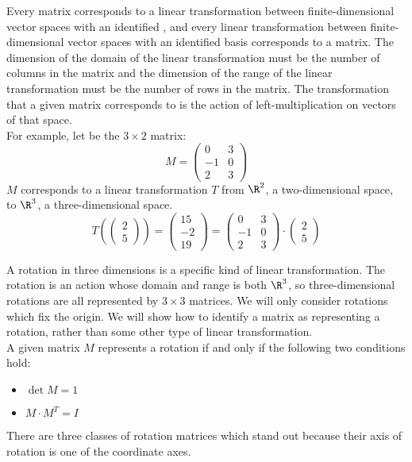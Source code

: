 
Every matrix corresponds to a linear transformation between finite-dimensional vector spaces with an identified , and every linear transformation between finite-dimensional vector spaces with an identified basis corresponds to a matrix. The dimension of the domain of the linear transformation must be the number of columns in the matrix and the dimension of the range of the linear transformation must be the number of rows in the matrix. The transformation that a given matrix corresponds to is the action of left-multiplication on vectors of that space. \\

For example, let  be the $3\times 2$ matrix:
\[
M= \begin{pmatrix} 0 & 3 \\ -1 & 0 \\ 2 & 3 \end{pmatrix}
\]
$M$ corresponds to a linear transformation $T$ from $\R^2$, a two-dimensional space, to $\R^3$, a three-dimensional space.
\[
T\left( \begin{pmatrix} 2 \\ 5 \end{pmatrix} \right)= \begin{pmatrix} 15 \\ -2 \\ 19 \end{pmatrix} = \begin{pmatrix} 0 & 3 \\ -1 & 0 \\ 2 & 3 \end{pmatrix} \cdot \begin{pmatrix} 2 \\ 5 \end{pmatrix}
\]


A rotation in three dimensions is a specific kind of linear transformation. The rotation is an action whose domain and range is both $\R^3$, so three-dimensional rotations are all represented by $3\times 3$ matrices. We will only consider rotations which fix the origin. We will show how to identify a matrix as representing a rotation, rather than some other type of linear transformation. \\

A given matrix $M$ represents a rotation if and only if the following two conditions hold:
\begin{itemize}
\item $\det M=1$
\item $M \cdot M^T=I$
\end{itemize}
There are three classes of rotation matrices which stand out because their axis of rotation is one of the coordinate axes.

